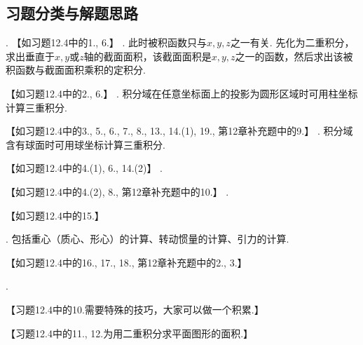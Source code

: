 \documentclass[12pt,UTF8]{ctexart}
\begin{document}
\subsection{习题分类与解题思路}
\begin{enumerate}
.
【如习题12.4中的1., 6.】
. 此时被积函数只与$x,y,z$之一有关. 先化为二重积分，求出垂直于$x,y$或$z$轴的截面面积，该截面面积是$x,y,z$之一的函数，然后求出该被积函数与截面面积乘积的定积分.

【如习题12.4中的2., 6.】
. 积分域在任意坐标面上的投影为圆形区域时可用柱坐标计算三重积分.

【如习题12.4中的3., 5., 6., 7., 8., 13., 14.(1), 19., 第12章补充题中的9.】
. 积分域含有球面时可用球坐标计算三重积分.

【如习题12.4中的4.(1), 6., 14.(2)】
.

【如习题12.4中的4.(2), 8., 第12章补充题中的10.】
.

【如习题12.4中的15.】

. 包括重心（质心、形心）的计算、转动惯量的计算、引力的计算.

【如习题12.4中的16., 17., 18., 第12章补充题中的2., 3.】

.

【习题12.4中的10.需要特殊的技巧，大家可以做一个积累.】

【习题12.4中的11., 12.为用二重积分求平面图形的面积.】

\end{enumerate}
\end{document}
